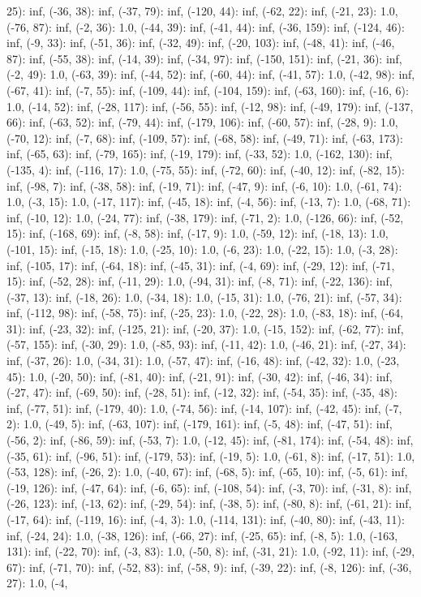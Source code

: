 \documentclass[parskip=half]{scrartcl}
\begin{document}
25): inf, (-36, 38): inf, (-37, 79): inf, (-120, 44): inf, (-62, 22): inf, (-21, 23): 1.0, (-76, 87): inf, (-2, 36): 1.0, (-44, 39): inf, (-41, 44): inf, (-36, 159): inf, (-124, 46): inf, (-9, 33): inf, (-51, 36): inf, (-32, 49): inf, (-20, 103): inf, (-48, 41): inf, (-46, 87): inf, (-55, 38): inf, (-14, 39): inf, (-34, 97): inf, (-150, 151): inf, (-21, 36): inf, (-2, 49): 1.0, (-63, 39): inf, (-44, 52): inf, (-60, 44): inf, (-41, 57): 1.0, (-42, 98): inf, (-67, 41): inf, (-7, 55): inf, (-109, 44): inf, (-104, 159): inf, (-63, 160): inf, (-16, 6): 1.0, (-14, 52): inf, (-28, 117): inf, (-56, 55): inf, (-12, 98): inf, (-49, 179): inf, (-137, 66): inf, (-63, 52): inf, (-79, 44): inf, (-179, 106): inf, (-60, 57): inf, (-28, 9): 1.0, (-70, 12): inf, (-7, 68): inf, (-109, 57): inf, (-68, 58): inf, (-49, 71): inf, (-63, 173): inf, (-65, 63): inf, (-79, 165): inf, (-19, 179): inf, (-33, 52): 1.0, (-162, 130): inf, (-135, 4): inf, (-116, 17): 1.0, (-75, 55): inf, (-72, 60): inf, (-40, 12): inf, (-82, 15): inf, (-98, 7): inf, (-38, 58): inf, (-19, 71): inf, (-47, 9): inf, (-6, 10): 1.0, (-61, 74): 1.0, (-3, 15): 1.0, (-17, 117): inf, (-45, 18): inf, (-4, 56): inf, (-13, 7): 1.0, (-68, 71): inf, (-10, 12): 1.0, (-24, 77): inf, (-38, 179): inf, (-71, 2): 1.0, (-126, 66): inf, (-52, 15): inf, (-168, 69): inf, (-8, 58): inf, (-17, 9): 1.0, (-59, 12): inf, (-18, 13): 1.0, (-101, 15): inf, (-15, 18): 1.0, (-25, 10): 1.0, (-6, 23): 1.0, (-22, 15): 1.0, (-3, 28): inf, (-105, 17): inf, (-64, 18): inf, (-45, 31): inf, (-4, 69): inf, (-29, 12): inf, (-71, 15): inf, (-52, 28): inf, (-11, 29): 1.0, (-94, 31): inf, (-8, 71): inf, (-22, 136): inf, (-37, 13): inf, (-18, 26): 1.0, (-34, 18): 1.0, (-15, 31): 1.0, (-76, 21): inf, (-57, 34): inf, (-112, 98): inf, (-58, 75): inf, (-25, 23): 1.0, (-22, 28): 1.0, (-83, 18): inf, (-64, 31): inf, (-23, 32): inf, (-125, 21): inf, (-20, 37): 1.0, (-15, 152): inf, (-62, 77): inf, (-57, 155): inf, (-30, 29): 1.0, (-85, 93): inf, (-11, 42): 1.0, (-46, 21): inf, (-27, 34): inf, (-37, 26): 1.0, (-34, 31): 1.0, (-57, 47): inf, (-16, 48): inf, (-42, 32): 1.0, (-23, 45): 1.0, (-20, 50): inf, (-81, 40): inf, (-21, 91): inf, (-30, 42): inf, (-46, 34): inf, (-27, 47): inf, (-69, 50): inf, (-28, 51): inf, (-12, 32): inf, (-54, 35): inf, (-35, 48): inf, (-77, 51): inf, (-179, 40): 1.0, (-74, 56): inf, (-14, 107): inf, (-42, 45): inf, (-7, 2): 1.0, (-49, 5): inf, (-63, 107): inf, (-179, 161): inf, (-5, 48): inf, (-47, 51): inf, (-56, 2): inf, (-86, 59): inf, (-53, 7): 1.0, (-12, 45): inf, (-81, 174): inf, (-54, 48): inf, (-35, 61): inf, (-96, 51): inf, (-179, 53): inf, (-19, 5): 1.0, (-61, 8): inf, (-17, 51): 1.0, (-53, 128): inf, (-26, 2): 1.0, (-40, 67): inf, (-68, 5): inf, (-65, 10): inf, (-5, 61): inf, (-19, 126): inf, (-47, 64): inf, (-6, 65): inf, (-108, 54): inf, (-3, 70): inf, (-31, 8): inf, (-26, 123): inf, (-13, 62): inf, (-29, 54): inf, (-38, 5): inf, (-80, 8): inf, (-61, 21): inf, (-17, 64): inf, (-119, 16): inf, (-4, 3): 1.0, (-114, 131): inf, (-40, 80): inf, (-43, 11): inf, (-24, 24): 1.0, (-38, 126): inf, (-66, 27): inf, (-25, 65): inf, (-8, 5): 1.0, (-163, 131): inf, (-22, 70): inf, (-3, 83): 1.0, (-50, 8): inf, (-31, 21): 1.0, (-92, 11): inf, (-29, 67): inf, (-71, 70): inf, (-52, 83): inf, (-58, 9): inf, (-39, 22): inf, (-8, 126): inf, (-36, 27): 1.0, (-4, 
\end{document}
